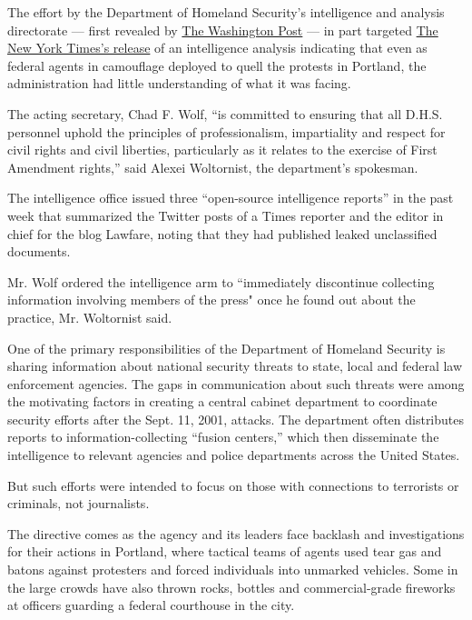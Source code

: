 The effort by the Department of Homeland Security's intelligence and
analysis directorate --- first revealed by
\href{https://www.washingtonpost.com/national-security/dhs-compiled-intelligence-reports-on-journalists-who-published-leaked-documents/2020/07/30/5be5ec9e-d25b-11ea-9038-af089b63ac21_story.html}{The
Washington Post} --- in part targeted
\href{https://www.nytimes.com/2020/07/28/us/federal-agents-portland-seattle-protests.html}{The
New York Times's release} of an intelligence analysis indicating that
even as federal agents in camouflage deployed to quell the protests in
Portland, the administration had little understanding of what it was
facing.

The acting secretary, Chad F. Wolf, ``is committed to ensuring that all
D.H.S. personnel uphold the principles of professionalism, impartiality
and respect for civil rights and civil liberties, particularly as it
relates to the exercise of First Amendment rights,'' said Alexei
Woltornist, the department's spokesman.

The intelligence office issued three ``open-source intelligence
reports'' in the past week that summarized the Twitter posts of a Times
reporter and the editor in chief for the blog Lawfare, noting that they
had published leaked unclassified documents.

Mr. Wolf ordered the intelligence arm to ``immediately discontinue
collecting information involving members of the press" once he found out
about the practice, Mr. Woltornist said.

One of the primary responsibilities of the Department of Homeland
Security is sharing information about national security threats to
state, local and federal law enforcement agencies. The gaps in
communication about such threats were among the motivating factors in
creating a central cabinet department to coordinate security efforts
after the Sept. 11, 2001, attacks. The department often distributes
reports to information-collecting ``fusion centers,'' which then
disseminate the intelligence to relevant agencies and police departments
across the United States.

But such efforts were intended to focus on those with connections to
terrorists or criminals, not journalists.

The directive comes as the agency and its leaders face backlash and
investigations for their actions in Portland, where tactical teams of
agents used tear gas and batons against protesters and forced
individuals into unmarked vehicles. Some in the large crowds have also
thrown rocks, bottles and commercial-grade fireworks at officers
guarding a federal courthouse in the city.

